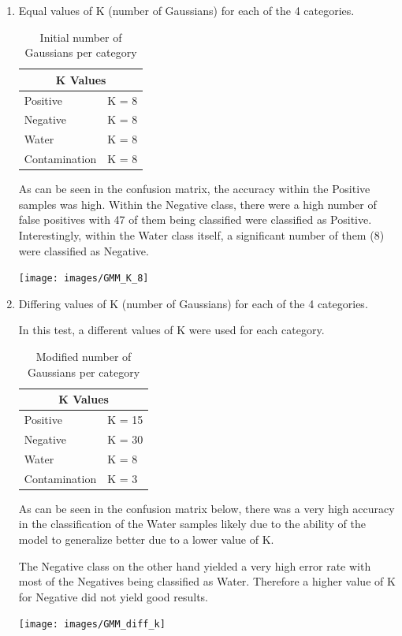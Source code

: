 \documentclass[a4paper,twoside,12pt]{report}
\begin{document}
\begin{enumerate}

\item Equal values of K (number of Gaussians) for each of the 4 categories. 

\begin{table} [!htbp]
  \centering
\begin{tabular}{ |l|l| }
  \hline
  \multicolumn{2}{|c|}{K Values} \\
  \hline
  Positive & K = 8 \\
  Negative & K = 8 \\
  Water & K = 8 \\
  Contamination & K = 8 \\
  \hline
\end{tabular}
\caption{Initial number of Gaussians per category}
\end{table}

As can be seen in the confusion matrix, the accuracy within the Positive samples was high.  Within the Negative class, there were a high number of false positives with 47 of them being classified were classified as Positive.   Interestingly, within the Water class itself, a significant number of them (8) were classified as Negative. 

\texttt{[image: images/GMM\_K\_8]}

\item Differing values of K (number of Gaussians) for each of the 4 categories.  

In this test, a different values of K were used for each category.   

\begin{table} [!htbp]
  \centering
\begin{tabular}{ |l|l| }
  \hline
  \multicolumn{2}{|c|}{K Values} \\
  \hline
  Positive & K = 15 \\
  Negative & K = 30 \\
  Water & K = 8 \\
  Contamination & K = 3 \\
  \hline
\end{tabular}
\caption{Modified number of Gaussians per category}
\end{table}
As can be seen in the confusion matrix below, there was a very high accuracy in the classification of the Water samples likely due to the ability of the model to generalize better due to a lower value of K. 

The Negative class on the other hand yielded a very high error rate with most of the Negatives being classified as Water.   Therefore a higher value of  K for Negative did not yield good results. 

\texttt{[image: images/GMM\_diff\_k]}





\end{enumerate}
\end{document}
